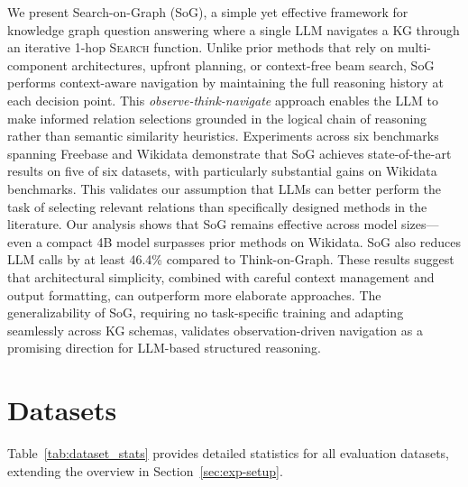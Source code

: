 \documentclass[sigconf]{acmart}
\begin{document}
We present Search-on-Graph (SoG), a simple yet effective framework for knowledge graph question answering where a single LLM navigates a KG through an iterative 1-hop \textsc{Search} function. Unlike prior methods that rely on multi-component architectures, upfront planning, or context-free beam search, SoG performs context-aware navigation by maintaining the full reasoning history at each decision point. This \textit{observe-think-navigate} approach enables the LLM to make informed relation selections grounded in the logical chain of reasoning rather than semantic similarity heuristics. Experiments across six benchmarks spanning Freebase and Wikidata demonstrate that SoG achieves state-of-the-art results on five of six datasets, with particularly substantial gains on Wikidata benchmarks. This validates our assumption that LLMs can better perform the task of selecting relevant relations than specifically designed methods in the literature. 
Our analysis shows that SoG remains effective across model sizes---even a compact 4B model surpasses prior methods on Wikidata. SoG also reduces LLM calls by at least 46.4\% compared to Think-on-Graph. These results suggest that architectural simplicity, combined with careful context management and output formatting, can outperform more elaborate approaches. The generalizability of SoG, requiring no task-specific training and adapting seamlessly across KG schemas, validates observation-driven navigation as a promising direction for LLM-based structured reasoning.








\balance
% 

\clearpage
\appendix

\onecolumn
\raggedbottom
\section{Datasets}
\label{app:datasets}

Table~\ref{tab:dataset_stats} provides detailed statistics for all evaluation datasets, extending the overview in Section~\ref{sec:exp-setup}.
\end{document}
